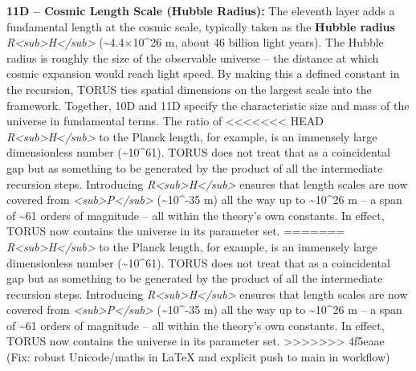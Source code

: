 \documentclass[]{article}
\begin{document}
\textbf{11D -- Cosmic Length Scale (Hubble Radius):} The eleventh layer
adds a fundamental length at the cosmic scale, typically taken as the
\textbf{Hubble radius}
\emph{R\textless{}sub\textgreater{}H\textless{}/sub\textgreater{}}
(\textasciitilde{}4.4×10\^{}26 m, about 46 billion light years). The
Hubble radius is roughly the size of the observable universe -- the
distance at which cosmic expansion would reach light speed. By making
this a defined constant in the recursion, TORUS ties spatial dimensions
on the largest scale into the framework. Together, 10D and 11D specify
the characteristic size and mass of the universe in fundamental terms.
The ratio of
<<<<<<< HEAD
\emph{R\textless sub\textgreater H\textless/sub\textgreater{}} to the
Planck length, for example, is an immensely large dimensionless number
(\textasciitilde10\^{}61). TORUS does not treat that as a coincidental
gap but as something to be generated by the product of all the
intermediate recursion steps. Introducing
\emph{R\textless sub\textgreater H\textless/sub\textgreater{}} ensures
that length scales are now covered from
\emph{\ell\textless sub\textgreater P\textless/sub\textgreater{}}
(\textasciitilde10\^{}-35 m) all the way up to \textasciitilde10\^{}26 m
-- a span of \textasciitilde61 orders of magnitude -- all within the
theory's own constants. In effect, TORUS now contains the universe in
its parameter set.
=======
\emph{R\textless{}sub\textgreater{}H\textless{}/sub\textgreater{}} to
the Planck length, for example, is an immensely large dimensionless
number (\textasciitilde{}10\^{}61). TORUS does not treat that as a
coincidental gap but as something to be generated by the product of all
the intermediate recursion steps. Introducing
\emph{R\textless{}sub\textgreater{}H\textless{}/sub\textgreater{}}
ensures that length scales are now covered from
\emph{\ell\textless{}sub\textgreater{}P\textless{}/sub\textgreater{}}
(\textasciitilde{}10\^{}-35 m) all the way up to
\textasciitilde{}10\^{}26 m -- a span of \textasciitilde{}61 orders of
magnitude -- all within the theory's own constants. In effect, TORUS now
contains the universe in its parameter set.
>>>>>>> 4f5eaae (Fix: robust Unicode/maths in LaTeX and explicit push to main in workflow)
\end{document}
